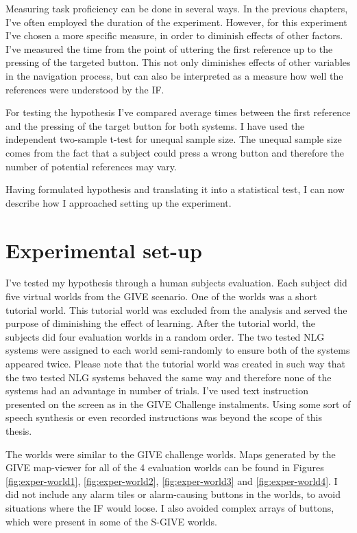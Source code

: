 Measuring task proficiency can be done in several ways. In the previous chapters, I've often employed the duration of the experiment. However, for this experiment I've chosen a more specific measure, in order to diminish effects of other factors. I've measured the time from the point of uttering the first reference up to the pressing of the targeted button. This not only diminishes effects of other variables in the navigation process, but can also be interpreted as a measure how well the references were understood by the IF.

For testing the hypothesis I've compared average times between the first reference and the pressing of the target button for both systems. I have used the independent two-sample t-test for unequal sample size. The unequal sample size comes from the fact that a subject could press a wrong button and therefore the number of potential references may vary.

Having formulated hypothesis and translating it into a statistical test, I can now describe how I approached setting up the experiment.

\section{Experimental set-up}
\label{sec:exper-setup}
I've tested my hypothesis through a human subjects evaluation. Each subject did five virtual worlds from the GIVE scenario. One of the worlds was a short tutorial world. This tutorial world was excluded from the analysis and served the purpose of diminishing the effect of learning. After the tutorial world, the subjects did four evaluation worlds in a random order. The two tested NLG systems were assigned to each world semi-randomly to ensure both of the systems appeared twice. Please note that the tutorial world was created in such way that the two tested NLG systems behaved the same way and therefore none of the systems had an advantage in number of trials. I've used text instruction presented on the screen as in the GIVE Challenge instalments. Using some sort of speech synthesis or even recorded instructions was beyond the scope of this thesis.

The worlds were similar to the GIVE challenge worlds. Maps generated by the GIVE map-viewer for all of the 4 evaluation worlds can be found in Figures \ref{fig:exper-world1}, \ref{fig:exper-world2}, \ref{fig:exper-world3} and \ref{fig:exper-world4}. I did not include any alarm tiles or alarm-causing buttons in the worlds, to avoid situations where the IF would loose. I also avoided complex arrays of buttons, which were present in some of the S-GIVE worlds.

